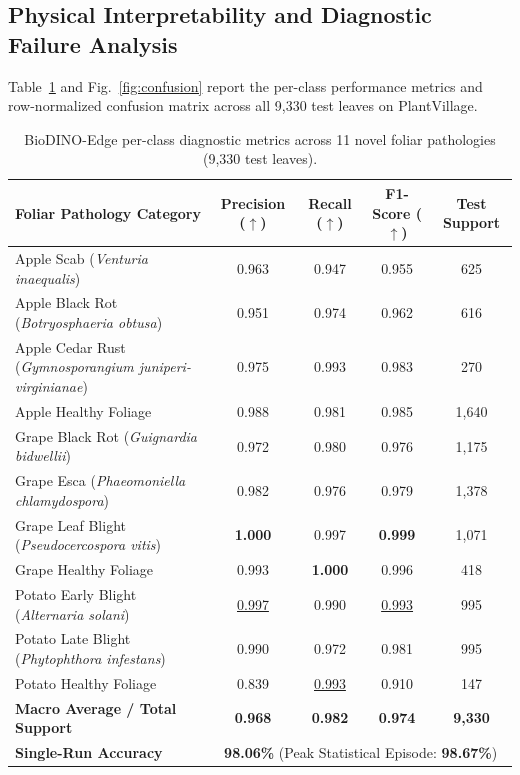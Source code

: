 \documentclass[preprint,12pt]{elsarticle}
\begin{document}
\subsection{Physical Interpretability and Diagnostic Failure Analysis}
\label{sec:per_class}

Table~\ref{tab:per_class} and Fig.~\ref{fig:confusion} report the per-class performance metrics and row-normalized confusion matrix across all 9,330 test leaves on PlantVillage.

\begin{table}[htbp]
\caption{BioDINO-Edge per-class diagnostic metrics across 11 novel foliar pathologies (9,330 test leaves).}
\label{tab:per_class}
\centering

\footnotesize
\setlength{\tabcolsep}{5pt}
\begin{tabularx}{\textwidth}{@{}>{\raggedright\arraybackslash}X *{4}{c}@{}}
\toprule
\textbf{Foliar Pathology Category} & \textbf{Precision ($\uparrow$)} & \textbf{Recall ($\uparrow$)} & \textbf{F1-Score ($\uparrow$)} & \textbf{Test Support} \\
\midrule
Apple Scab (\textit{Venturia inaequalis}) & 0.963 & 0.947 & 0.955 & 625 \\
Apple Black Rot (\textit{Botryosphaeria obtusa}) & 0.951 & 0.974 & 0.962 & 616 \\
Apple Cedar Rust (\textit{Gymnosporangium juniperi-virginianae}) & 0.975 & 0.993 & 0.983 & 270 \\
Apple Healthy Foliage & 0.988 & 0.981 & 0.985 & 1,640 \\
\midrule
Grape Black Rot (\textit{Guignardia bidwellii}) & 0.972 & 0.980 & 0.976 & 1,175 \\
Grape Esca (\textit{Phaeomoniella chlamydospora}) & 0.982 & 0.976 & 0.979 & 1,378 \\
Grape Leaf Blight (\textit{Pseudocercospora vitis}) & \textbf{1.000} & 0.997 & \textbf{0.999} & 1,071 \\
Grape Healthy Foliage & 0.993 & \textbf{1.000} & 0.996 & 418 \\
\midrule
Potato Early Blight (\textit{Alternaria solani}) & \underline{0.997} & 0.990 & \underline{0.993} & 995 \\
Potato Late Blight (\textit{Phytophthora infestans}) & 0.990 & 0.972 & 0.981 & 995 \\
Potato Healthy Foliage & 0.839 & \underline{0.993} & 0.910 & 147 \\
\midrule
\textbf{Macro Average / Total Support} & \textbf{0.968} & \textbf{0.982} & \textbf{0.974} & \textbf{9,330} \\
\textbf{Single-Run Accuracy} & \multicolumn{4}{c}{\textbf{98.06\%} (Peak Statistical Episode: \textbf{98.67\%})} \\
\bottomrule
\end{tabularx}
\end{table}
\end{document}
